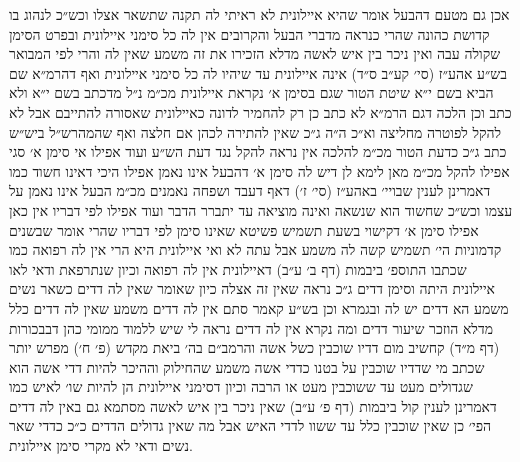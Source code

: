 \documentclass[12pt, openany]{book}
\begin{document}
\begin{multicols}{2}
אכן גם מטעם דהבעל אומר שהיא איילונית לא ראיתי לה תקנה שתשאר אצלו וכש״כ לנהוג בו קדושת כהונה שהרי כנראה מדברי הבעל והקרובים אין לה כל סימני איילונית ובפרט הסימן שקולה עבה ואין ניכר בין איש לאשה מדלא הזכירו את זה משמע שאין לה והרי לפי המבואר בש״ע אהע״ז (סי׳ קע״ב ס״ד) אינה איילונית עד שיהיו לה כל סימני איילונית ואף דהרמ״א שם הביא בשם י״א שיטת הטור שגם בסימן א׳ נקראת איילונית מכ״מ נ״ל מדכתב בשם י״א ולא כתב וכן הלכה דגם הרמ״א לא כתב כן רק להחמיר לדונה כאיילונית שאסורה להתייבם אבל לא להקל לפוטרה מחליצה וא״כ ה״ה ג״כ שאין להתירה לכהן אם חלצה ואף שהמהרש״ל ביש״ש כתב ג״כ כדעת הטור מכ״מ להלכה אין נראה להקל נגד דעת הש״ע ועוד אפילו אי סימן א׳ סגי אפילו להקל מכ״מ מאן לימא לן דיש לה סימן א׳ דהבעל אינו נאמן אפילו היכי דאינו חשוד כמו דאמרינן לענין שבויי׳ באהע״ז (סי׳ ז׳) דאף דעבד ושפחה נאמנים מכ״מ הבעל אינו נאמן על עצמו וכש״כ שחשוד הוא שנשאה ואינה מוציאה עד יתברר הדבר ועוד אפילו לפי דבריו אין כאן אפילו סימן א׳ דקישוי בשעת תשמיש פשיטא שאינו סימן לפי דבריו שהרי אומר שבשנים קדמוניות הי׳ תשמיש קשה לה משמע אבל עתה לא ואי איילונית היא הרי אין לה רפואה כמו שכתבו התוספ׳ ביבמות (דף ב׳ ע״ב) דאיילונית אין לה רפואה וכיון שנתרפאת ודאי לאו איילונית היתה וסימן דדים ג״כ נראה שאין זה אצלה כיון שאומר שאין לה דדים כשאר נשים משמע הא דדים יש לה ובגמרא וכן בש״ע קאמר סתם אין לה דדים משמע שאין לה דדים כלל מדלא הוזכר שיעור דדים ומה נקרא אין לה דדים נראה לי שיש ללמוד ממומי כהן דבבכורות (דף מ״ד) קחשיב מום דדיו שוכבין כשל אשה והרמב״ם בה׳ ביאת מקדש (פ׳ ח׳) מפרש יותר שכתב מי שדדיו שוכבין על בטנו כדדי אשה משמע שהחילוק וההיכר להיות דדי אשה הוא שגדולים מעט עד ששוכבין מעט או הרבה וכיון דסימני איילונית הן להיות שו׳ לאיש כמו דאמרינן לענין קול ביבמות (דף פ׳ ע״ב) שאין ניכר בין איש לאשה מסתמא גם באין לה דדים הפי׳ כן שאין שוכבין כלל עד ששוו לדדי האיש אבל מה שאין גדולים הדדים כ״כ כדדי שאר נשים ודאי לא מקרי סימן איילונית.\\\vspace{0pt}


\end{multicols}
\end{document}
